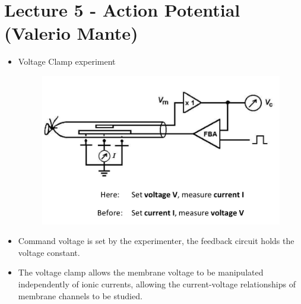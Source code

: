 \documentclass[english,11pt]{article}
\begin{document}
\section{Lecture 5 - Action Potential (Valerio Mante)}


\begin{itemize}
\item Voltage Clamp experiment\\
\begin{figure}[htbp]
\centering
  \includegraphics[scale=0.4]{images/5_1.jpg}
\end{figure} 

\item Command voltage is set by the experimenter, the feedback circuit holds the voltage constant.
\item The voltage clamp allows the membrane voltage to be manipulated independently of ionic currents, allowing the current-voltage relationships of membrane channels to be studied.


\end{itemize}
\end{document}
